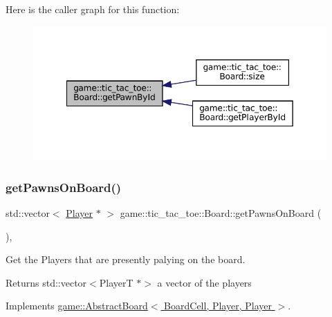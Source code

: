 Here is the caller graph for this function\+:
\nopagebreak
\begin{figure}[H]
\begin{center}
\leavevmode
\includegraphics[width=349pt]{classgame_1_1tic__tac__toe_1_1_board_a7f11ea8d48d9613057dd8164a7610f9a_icgraph}
\end{center}
\end{figure}
\mbox{\label{classgame_1_1tic__tac__toe_1_1_board_a84cb90a6d844d80ecd5857fb4dc9ad1a}} 
\subsubsection{\texorpdfstring{get\+Pawns\+On\+Board()}{getPawnsOnBoard()}}
{\footnotesize\ttfamily std\+::vector$<$ \hyperlink{classgame_1_1tic__tac__toe_1_1_player}{Player} $\ast$ $>$ game\+::tic\+\_\+tac\+\_\+toe\+::\+Board\+::get\+Pawns\+On\+Board (\begin{DoxyParamCaption}{ }\end{DoxyParamCaption})\hspace{0.3cm}{\ttfamily [override]}, {\ttfamily [virtual]}}



Get the Players that are presently palying on the board. 

\begin{DoxyReturn}{Returns}
std\+::vector$<$\+Player\+T $\ast$$>$ a vector of the players 
\end{DoxyReturn}


Implements \hyperlink{classgame_1_1_abstract_board_a9c8a033b23ade01ecce24e95723ffd35}{game\+::\+Abstract\+Board$<$ Board\+Cell, Player, Player $>$}.

